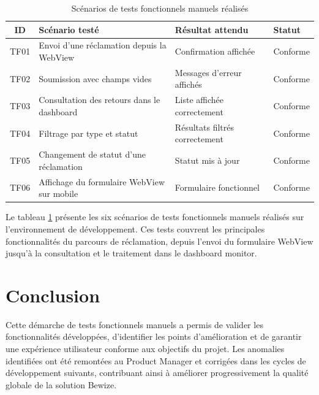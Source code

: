 \begin{table}[H]
\centering
\caption{Scénarios de tests fonctionnels manuels réalisés}
\label{tab:tests_manuels}
\renewcommand{\arraystretch}{1.8}
\begin{tabular}{|c|p{5cm}|p{4cm}|p{2cm}|}
\hline
\textbf{ID} & \textbf{Scénario testé} & \textbf{Résultat attendu} & 
\textbf{Statut} \\
\hline
TF01 & Envoi d'une réclamation depuis la WebView & 
Confirmation affichée & Conforme \\
\hline
TF02 & Soumission avec champs vides & 
Messages d'erreur affichés & Conforme \\
\hline
TF03 & Consultation des retours dans le dashboard & 
Liste affichée correctement & Conforme \\
\hline
TF04 & Filtrage par type et statut & 
Résultats filtrés correctement & Conforme \\
\hline
TF05 & Changement de statut d'une réclamation & 
Statut mis à jour & Conforme \\
\hline
TF06 & Affichage du formulaire WebView sur mobile & 
Formulaire fonctionnel & Conforme \\
\hline
\end{tabular}
\end{table}

Le tableau \ref{tab:tests_manuels} présente les six scénarios de tests 
fonctionnels manuels réalisés sur l'environnement de développement. 
Ces tests couvrent les principales fonctionnalités du parcours de 
réclamation, depuis l'envoi du formulaire WebView jusqu'à la 
consultation et le traitement dans le dashboard monitor.

\section{Conclusion}

Cette démarche de tests fonctionnels manuels a permis de valider 
les fonctionnalités développées, d'identifier les points d'amélioration 
et de garantir une expérience utilisateur conforme aux objectifs 
du projet. Les anomalies identifiées ont été remontées au Product 
Manager et corrigées dans les cycles de développement suivants, 
contribuant ainsi à améliorer progressivement la qualité globale 
de la solution Bewize.
